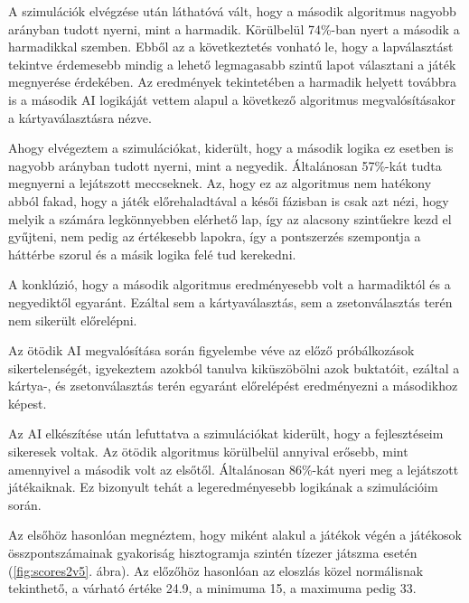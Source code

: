 
A szimulációk elvégzése után láthatóvá vált, hogy a második algoritmus nagyobb arányban tudott nyerni, mint a harmadik. Körülbelül 74\%-ban nyert a második a harmadikkal szemben. Ebből az a következtetés vonható le, hogy a lapválasztást tekintve érdemesebb mindig a lehető legmagasabb szintű lapot választani a játék megnyerése érdekében. Az eredmények tekintetében a harmadik helyett továbbra is a második AI logikáját vettem alapul a következő algoritmus megvalósításakor a kártyaválasztásra nézve.


Ahogy elvégeztem a szimulációkat, kiderült, hogy a második logika ez esetben is nagyobb arányban tudott nyerni, mint a negyedik. Általánosan 57\%-kát tudta megnyerni a lejátszott meccseknek. Az, hogy ez az algoritmus nem hatékony abból fakad, hogy a játék előrehaladtával a késői fázisban is csak azt nézi, hogy melyik a számára legkönnyebben elérhető lap, így az alacsony szintűekre kezd el gyűjteni, nem pedig az értékesebb lapokra, így a pontszerzés szempontja a háttérbe szorul és a másik logika felé tud kerekedni.

A konklúzió, hogy a második algoritmus eredményesebb volt a harmadiktól és a negyediktől egyaránt. Ezáltal sem a kártyaválasztás, sem a zsetonválasztás terén nem sikerült előrelépni.



Az ötödik AI megvalósítása során figyelembe véve az előző próbálkozások sikertelenségét, igyekeztem azokból tanulva kiküszöbölni azok buktatóit, ezáltal a kártya-, és zsetonválasztás terén egyaránt előrelépést eredményezni a másodikhoz képest.

Az AI elkészítése után lefuttatva a szimulációkat kiderült, hogy a fejlesztéseim sikeresek voltak.
Az ötödik algoritmus körülbelül annyival erősebb, mint amennyivel a második volt az elsőtől. Általánosan 86\%-kát nyeri meg a lejátszott játékaiknak. Ez bizonyult tehát a legeredményesebb logikának a szimulációim során.

Az elsőhöz hasonlóan megnéztem, hogy miként alakul a játékok végén a játékosok összpontszámainak gyakoriság hisztogramja szintén tízezer játszma esetén (\ref{fig:scores2v5}. ábra). Az előzőhöz hasonlóan az eloszlás közel normálisnak tekinthető, a várható értéke 24.9, a minimuma 15, a maximuma pedig 33.

